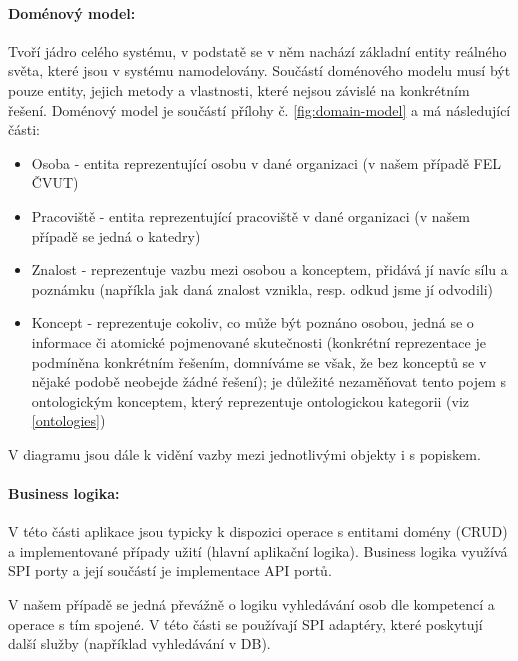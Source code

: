 \paragraph{Doménový model:} Tvoří jádro celého systému, v podstatě se v něm nachází základní entity reálného světa, které jsou v systému namodelovány. Součástí doménového modelu musí být pouze entity, jejich metody a vlastnosti, které nejsou závislé na konkrétním řešení.
Doménový model je součástí přílohy č. \ref{fig:domain-model} a má následující části:
\begin{itemize}
    \item Osoba - entita reprezentující osobu v dané organizaci (v našem případě FEL ČVUT)
    \item Pracoviště - entita reprezentující pracoviště v dané organizaci (v našem případě se jedná o katedry)
    \item Znalost - reprezentuje vazbu mezi osobou a konceptem, přidává jí navíc sílu a poznámku (napříkla jak daná znalost vznikla, resp. odkud jsme jí odvodili)
    \item Koncept - reprezentuje cokoliv, co může být poznáno osobou, jedná se o informace či atomické pojmenované skutečnosti (konkrétní reprezentace je podmíněna konkrétním řešením, domníváme se však, že bez konceptů se v nějaké podobě neobejde žádné řešení); je důležité nezaměňovat tento pojem s ontologickým konceptem, který reprezentuje ontologickou kategorii (viz \ref{ontologies})
\end{itemize}
V diagramu jsou dále k vidění vazby mezi jednotlivými objekty i s popiskem. 
\paragraph{Business logika:}
V této části aplikace jsou typicky k dispozici operace s entitami domény (CRUD) a implementované případy užití (hlavní aplikační logika). Business logika využívá SPI porty a její součástí je implementace API portů.\par
V našem případě se jedná převážně o logiku vyhledávání osob dle kompetencí a operace s tím spojené. V této části se používají SPI adaptéry, které poskytují další služby (například vyhledávání v DB).
